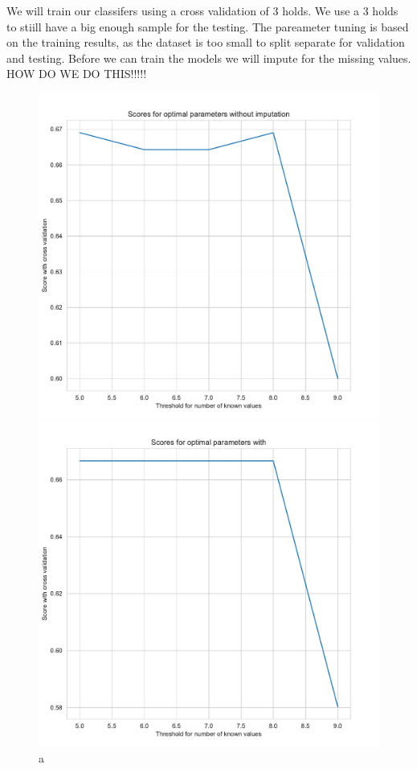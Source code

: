 \documentclass[11pt]{article}
\begin{document}
We will train our classifers using a cross validation of 3 holds. We use a 3 holds to stiill have a big enough sample for the testing. The pareameter tuning is based on the training results, as the dataset is too small to split separate for validation and testing. Before we can train the models we will impute for the missing values. 
HOW DO WE DO THIS!!!!!
\begin{figure}[h]
\begin{minipage}[l]{0.5\textwidth}
\includegraphics[width=1\linewidth]{bridges/threshold_grid_ppn0.pdf}
\end{minipage}
\begin{minipage}[l]{0.5\textwidth}
\includegraphics[width=1\linewidth]{bridges/threshold_grid_ppn1.pdf}
\end{minipage}
\caption{a}
\label{Fig:: PPN_treshhol_grid}
\end{figure}
\end{document}
